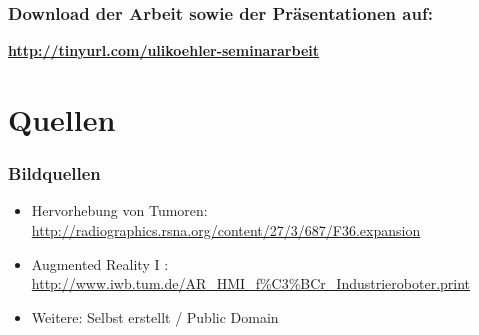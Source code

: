 \documentclass[14pt]{beamer}
\begin{document}
\begin{frame}
 \frametitle{Download der Arbeit sowie der Präsentationen auf:}
 \begin{center}
   \textbf{\url{http://tinyurl.com/ulikoehler-seminararbeit}}
 \end{center}
\end{frame}

%
%
\section{Quellen}
\begin{frame}[shrink]
 \frametitle{Bildquellen}
 \begin{itemize}
  \item Hervorhebung von Tumoren:\\ \url{http://radiographics.rsna.org/content/27/3/687/F36.expansion}
  \item Augmented Reality I :\\ \url{http://www.iwb.tum.de/AR_HMI_f\%C3\%BCr_Industrieroboter.print}
  \item Weitere: Selbst erstellt / Public Domain
 \end{itemize}
 
\end{frame}
\end{document}
